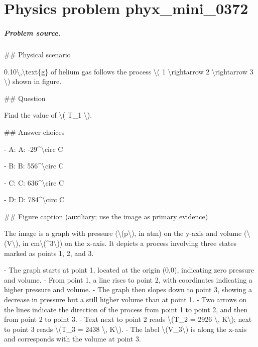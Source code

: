 
\chapter{Physics problem phyx\_mini\_0372}
\label{ch:PhyXMiniProblems_problem_phyx_mini_0372}

\paragraph{Problem source.}
\#\# Physical scenario

0.10\textbackslash{},\textbackslash{}text\{g\} of helium gas follows the process \textbackslash{}( 1 \textbackslash{}rightarrow 2 \textbackslash{}rightarrow 3 \textbackslash{}) shown in figure.

\#\# Question

Find the value of \textbackslash{}( T\_1 \textbackslash{}).

\#\# Answer choices

- A: A: -29\textasciicircum{}\textbackslash{}circ C

- B: B: 556\textasciicircum{}\textbackslash{}circ C

- C: C: 636\textasciicircum{}\textbackslash{}circ C

- D: D: 784\textasciicircum{}\textbackslash{}circ C

\#\# Figure caption (auxiliary; use the image as primary evidence)

The image is a graph with pressure (\textbackslash{}(p\textbackslash{}), in atm) on the y-axis and volume (\textbackslash{}(V\textbackslash{}), in cm\textbackslash{}(\textasciicircum{}3\textbackslash{})) on the x-axis. It depicts a process involving three states marked as points 1, 2, and 3.

- The graph starts at point 1, located at the origin (0,0), indicating zero pressure and volume.
- From point 1, a line rises to point 2, with coordinates indicating a higher pressure and volume.
- The graph then slopes down to point 3, showing a decrease in pressure but a still higher volume than at point 1.
- Two arrows on the lines indicate the direction of the process from point 1 to point 2, and then from point 2 to point 3.
- Text next to point 2 reads \textbackslash{}(T\_2 = 2926 \textbackslash{}, K\textbackslash{}); next to point 3 reads \textbackslash{}(T\_3 = 2438 \textbackslash{}, K\textbackslash{}).
- The label \textbackslash{}(V\_3\textbackslash{}) is along the x-axis and corresponds with the volume at point 3.

